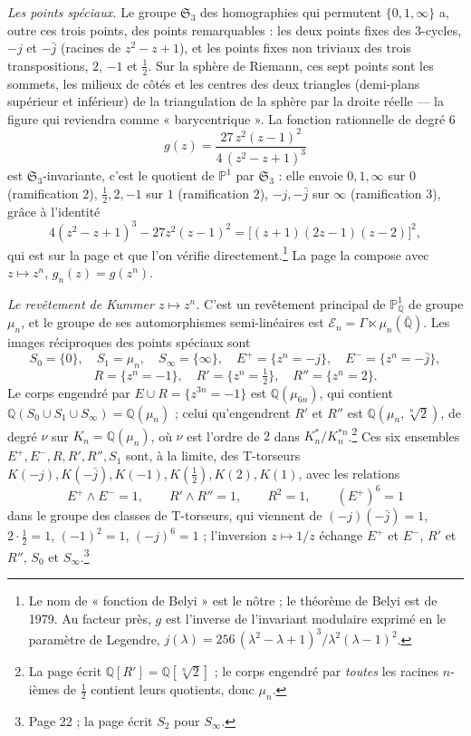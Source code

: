 \documentclass[11pt,a4paper]{article}
\begin{document}
\emph{Les points spéciaux.} Le groupe $\mathfrak{S}_{3}$ des homographies qui
permutent $\{0, 1, \infty\}$ a, outre ces trois points, des points
remarquables : les deux points fixes des 3-cycles, $-j$ et $-\bar{j}$ (racines
de $z^{2} - z + 1$), et les points fixes non triviaux des trois
transpositions, $2$, $-1$ et $\tfrac12$. Sur la sphère de Riemann, ces sept
points sont les sommets, les milieux de côtés et les centres des deux
triangles (demi-plans supérieur et inférieur) de la triangulation de la sphère
par la droite réelle --- la figure qui reviendra comme « barycentrique ».
La fonction rationnelle de degré $6$
\[
g(z) = \frac{27\, z^{2}(z-1)^{2}}{4\,(z^{2} - z + 1)^{3}}
\]
est $\mathfrak{S}_{3}$-invariante, c'est le quotient de $\mathbb{P}^{1}$ par
$\mathfrak{S}_{3}$ : elle envoie $0, 1, \infty$ sur $0$ (ramification $2$),
$\tfrac12, 2, -1$ sur $1$ (ramification $2$), $-j, -\bar{j}$ sur $\infty$
(ramification $3$), grâce à l'identité
\[
4(z^{2} - z + 1)^{3} - 27 z^{2}(z-1)^{2} = \bigl[(z+1)(2z-1)(z-2)\bigr]^{2},
\]
qui est sur la page et que l'on vérifie directement.\footnote{Le nom de
« fonction de Belyi » est le nôtre ; le théorème de Belyi est de 1979. Au
facteur près, $g$ est l'inverse de l'invariant modulaire exprimé en le
paramètre de Legendre, $j(\lambda) = 256\,(\lambda^{2} - \lambda +
1)^{3}/\lambda^{2}(\lambda-1)^{2}$.} La page la compose avec $z \mapsto z^{n}$,
$g_{n}(z) = g(z^{n})$.

\emph{Le revêtement de Kummer $z \mapsto z^{n}$.} C'est un revêtement principal
de $\mathbb{P}^{1}_{\mathbb{Q}}$ de groupe $\mu_{n}$, et le groupe de ses
automorphismes semi-linéaires est $\mathcal{E}_{n} = \Gamma \ltimes
\mu_{n}(\bar{\mathbb{Q}})$. Les images réciproques des points spéciaux sont
\[
S_{0} = \{0\}, \quad S_{1} = \mu_{n}, \quad S_{\infty} = \{\infty\}, \quad
E^{+} = \{z^{n} = -j\}, \quad E^{-} = \{z^{n} = -\bar{j}\},
\]
\[
R = \{z^{n} = -1\}, \quad R' = \{z^{n} = \tfrac12\}, \quad R'' = \{z^{n} = 2\}.
\]
Le corps engendré par $E \cup R = \{z^{3n} = -1\}$ est $\mathbb{Q}(\mu_{6n})$, qui
contient $\mathbb{Q}(S_{0} \cup S_{1} \cup S_{\infty}) = \mathbb{Q}(\mu_{n})$ ;
celui qu'engendrent $R'$ et $R''$ est $\mathbb{Q}(\mu_{n}, \sqrt[n]{2})$, de degré
$\nu$ sur $K_{n} = \mathbb{Q}(\mu_{n})$, où $\nu$ est l'ordre de $2$ dans
$K_{n}^{*}/K_{n}^{*n}$.\footnote{La page écrit $\mathbb{Q}[R'] =
\mathbb{Q}[\sqrt[n]{2}]$ ; le corps engendré par \emph{toutes} les racines
$n$-ièmes de $\tfrac12$ contient leurs quotients, donc $\mu_{n}$.} Ces six
ensembles $E^{+}, E^{-}, R, R', R'', S_{1}$ sont, à la limite, des
$\mathrm{T}$-torseurs $K(-j), K(-\bar{j}), K(-1), K(\tfrac12), K(2), K(1)$, avec
les relations
\[
E^{+} \wedge E^{-} = 1, \qquad R' \wedge R'' = 1, \qquad R^{2} = 1, \qquad
(E^{+})^{6} = 1
\]
dans le groupe des classes de $\mathrm{T}$-torseurs, qui viennent de
$(-j)(-\bar{j}) = 1$, $2 \cdot \tfrac12 = 1$, $(-1)^{2} = 1$, $(-j)^{6} = 1$ ;
l'inversion $z \mapsto 1/z$ échange $E^{+}$ et $E^{-}$, $R'$ et $R''$, $S_{0}$ et
$S_{\infty}$.\footnote{Page 22 ; la page écrit $S_{2}$ pour $S_{\infty}$.}
\end{document}
